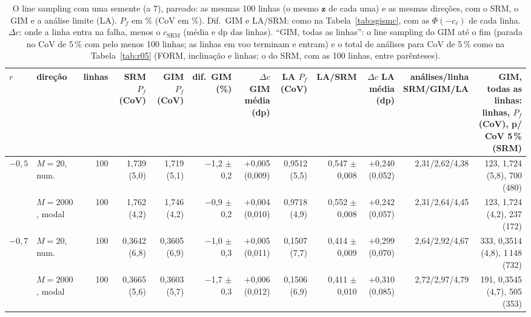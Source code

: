 \begin{table}[H]\centering\footnotesize\setlength{\tabcolsep}{2pt}
\caption{O line sampling com uma semente (a 7), pareado: as mesmas 100 linhas (o mesmo $\bm z$ de cada uma) e as mesmas direções, com o SRM, o GIM e a análise limite (LA). $P_f$ em \% (CoV em \%). Dif.\ GIM e LA/SRM: como na Tabela~\ref{tab:sgismc}, com as $\Phi(-c_\ell)$ de cada linha. $\Delta c$: onde a linha entra na falha, menos o $c_\text{SRM}$ (média e dp das linhas). ``GIM, todas as linhas'': o line sampling do GIM até o fim (parada no CoV de 5\,\% com pelo menos 100 linhas; as linhas em voo terminam e entram) e o total de análises para CoV de 5\,\% como na Tabela~\ref{tab:r05} (FORM, inclinação e linhas; o do SRM, com as 100 linhas, entre parênteses).}\label{tab:sgls}
\begin{tabular}{llrrrrrrrrrr}\toprule
$r$ & direção & linhas & \makecell{SRM\\$P_f$ (CoV)} & \makecell{GIM\\$P_f$ (CoV)} & \makecell{dif.\ GIM\\(\%)} & \makecell{$\Delta c$ GIM\\média (dp)} & \makecell{LA\\$P_f$ (CoV)} & LA/SRM & \makecell{$\Delta c$ LA\\média (dp)} & \makecell{análises/linha\\SRM/GIM/LA} & \makecell{GIM, todas as linhas: linhas,\\$P_f$ (CoV), p/ CoV 5\,\% (SRM)} \\\midrule
$-0{,}5$ & $M = 20$, num. & 100 & 1,739 (5,0) & 1,719 (5,1) & $-$1,2 $\pm$ 0,2 & $+$0,005 (0,009) & 0,9512 (5,5) & 0,547 $\pm$ 0,008 & $+$0,240 (0,052) & 2,31/2,62/4,38 & 123, 1,724 (5,8), 700 (480) \\
 & $M = 2000$, modal & 100 & 1,762 (4,2) & 1,746 (4,2) & $-$0,9 $\pm$ 0,2 & $+$0,004 (0,010) & 0,9718 (4,9) & 0,552 $\pm$ 0,008 & $+$0,242 (0,057) & 2,31/2,64/4,45 & 123, 1,724 (4,2), 237 (172) \\
\midrule
$-0{,}7$ & $M = 20$, num. & 100 & 0,3642 (6,8) & 0,3605 (6,9) & $-$1,0 $\pm$ 0,3 & $+$0,005 (0,011) & 0,1507 (7,7) & 0,414 $\pm$ 0,009 & $+$0,299 (0,070) & 2,64/2,92/4,67 & 333, 0,3514 (4,8), 1\,148 (732) \\
 & $M = 2000$, modal & 100 & 0,3665 (5,6) & 0,3603 (5,7) & $-$1,7 $\pm$ 0,3 & $+$0,006 (0,012) & 0,1506 (6,9) & 0,411 $\pm$ 0,010 & $+$0,310 (0,085) & 2,72/2,97/4,79 & 191, 0,3545 (4,7), 505 (353) \\
\bottomrule\end{tabular}\end{table}
